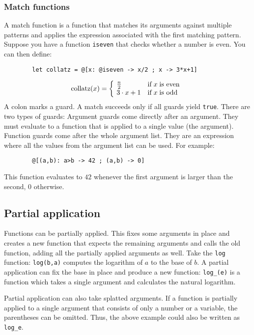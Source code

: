 \documentclass[10pt]{article}
\begin{document}
    \subsubsection{Match functions}
    A match function is a function that matches its arguments against multiple patterns and applies the expression associated with the first matching pattern.
    Suppose you have a function \verb|iseven| that checks whether a number is even.
    You can then define:
    \begin{verbatim}
        let collatz = @[x: @iseven -> x/2 ; x -> 3*x+1]
    \end{verbatim}
    \[
        \mathrm{collatz}(x) = \left\{\kern-\nulldelimiterspace\begin{array}{ll}
            \frac{n}{2}   & \textrm{if}\;x\;\textrm{is even} \\
            3 \cdot x + 1 & \textrm{if}\;x\;\textrm{is odd}
        \end{array} \right.
    \]
    A colon marks a guard.
    A match succeeds only if all guards yield \verb|true|.
    There are two types of guards: Argument guards come directly after an argument.
    They must evaluate to a function that is applied to a single value (the argument).
    Function guards come after the whole argument list.
    They are an expression where all the values from the argument list can be used.
    For example:
    \begin{verbatim}
        @[(a,b): a>b -> 42 ; (a,b) -> 0]
    \end{verbatim}
    This function evaluates to $ 42 $ whenever the first argument is larger than the second, $ 0 $ otherwise.
    
    \subsection{Partial application}\label{subsec:partial-application}
    Functions can be partially applied.
    This fixes some arguments in place and creates a new function that expects the remaining arguments and calls the old function, adding all the partially applied arguments as well.
    Take the \verb|log| function: \verb|log(b,a)| computes the logarithm of $ a $ to the base of $ b $.
    A partial application can fix the base in place and produce a new function:
    \verb|log_(e)| is a function which takes a single argument and calculates the natural logarithm.
    
    Partial application can also take splatted arguments.
    If a function is partially applied to a single argument that consists of only a number or a variable, the parentheses can be omitted.
    Thus, the above example could also be written as \verb|log_e|.
    
\end{document}
